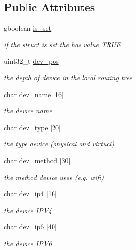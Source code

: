 \subsection*{Public Attributes}
\begin{DoxyCompactItemize}
\item 
gboolean \hyperlink{structnet__device_af10284ed56562f2cd96fdb5ef22005d7}{is\+\_\+set}
\begin{DoxyCompactList}\small\item\em if the struct is set the has value T\+R\+UE \end{DoxyCompactList}\item 
uint32\+\_\+t \hyperlink{structnet__device_a8201165f1f516678fdbddffe8c786dd7}{dev\+\_\+pos}
\begin{DoxyCompactList}\small\item\em the depth of device in the local routing tree \end{DoxyCompactList}\item 
char \hyperlink{structnet__device_a683f88ff26dc8478bba51b95c39d9b92}{dev\+\_\+name} \mbox{[}16\mbox{]}
\begin{DoxyCompactList}\small\item\em the device name \end{DoxyCompactList}\item 
char \hyperlink{structnet__device_a65788d250a2b47bbbafeedfaa99ac695}{dev\+\_\+type} \mbox{[}20\mbox{]}
\begin{DoxyCompactList}\small\item\em the type device (physical and virtual) \end{DoxyCompactList}\item 
char \hyperlink{structnet__device_af33238d65f52774902101ad3255372f4}{dev\+\_\+method} \mbox{[}30\mbox{]}
\begin{DoxyCompactList}\small\item\em the method device uses (e.\+g. wifi) \end{DoxyCompactList}\item 
char \hyperlink{structnet__device_a92b5a35950b5bfaeb721be117e241528}{dev\+\_\+ip4} \mbox{[}16\mbox{]}
\begin{DoxyCompactList}\small\item\em the device I\+P\+V4 \end{DoxyCompactList}\item 
char \hyperlink{structnet__device_a7a8e6311682a530bfdeda88cfa808ed1}{dev\+\_\+ip6} \mbox{[}40\mbox{]}
\begin{DoxyCompactList}\small\item\em the device I\+P\+V6 \end{DoxyCompactList}\item 

\end{DoxyCompactItemize}
